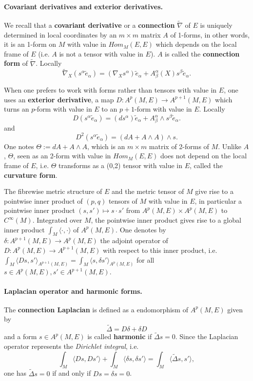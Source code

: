 \paragraph{Covariant derivatives and exterior derivatives.}
\label{sec:org5b3844c}
We recall that a \textbf{covariant derivative} or a \textbf{connection} \(\tilde\nabla\) of \(E\) is uniquely determined in 
local coordinates by an \(m\times m\) matrix \(A\) of 1-forms, in other
words, it is an 1-form on \(M\) with value in \(Hom_M(E,E)\) which depends on the local frame
of \(E\) (i.e. \(A\) is not a tensor with value in \(E\)). \(A\) is called the
\textbf{connection form} of \(\tilde \nabla\). Locally
\[
 \tilde\nabla_X (s^\alpha \tilde e_\alpha) = (\nabla_X s^\alpha) \tilde e_\alpha +
A^\alpha_\beta(X)s^\beta\tilde e_\alpha.
\]



When one prefers to work with forms rather than tensors with value in \(E\), one uses an
\textbf{exterior derivative}, a map \(D: A^p(M,E) \longrightarrow A^{p+1}(M,E)\) which turns an
\(p\)-form with value in \(E\) to an \(p+1\)-form with value in \(E\). Locally 
\[
 D (s^\alpha \tilde e_\alpha) = (d s^\alpha) \tilde e_\alpha +
A^\alpha_\beta\wedge s^\beta\tilde e_\alpha.
\]
and 
\[
 D^2(s^\alpha \tilde e_\alpha) = (dA + A\wedge A)\wedge s.
\]
One notes \(\Theta := dA + A\wedge A\), which is an \(m\times m\) matrix of 2-forms of
\(M\). Unlike \(A\), \(\Theta\), seen as an 2-form with value in \(Hom_M(E,E)\)
does not depend on the local frame of \(E\), i.e. \(\Theta\) transforms as a (0,2)
tensor with value in \(E\), called the \textbf{curvature form}.



The fibrewise metric structure of \(E\) and the metric tensor of \(M\) give rise to a pointwise inner product of
\((p,q)\) tensors of \(M\) with value in \(E\), in particular a pointwise inner
product \((s, s')\mapsto s\cdot s'\) from \(A^p(M,E)\times A^p(M,E)\) to \(C^\infty(M)\). Integrated over \(M\), the pointwise inner product gives rise
to a global inner product \(\int_M \langle  \cdot,\cdot \rangle\) of \(A^p(M,E)\). One denotes by
\(\delta: A^{p+1}(M,E)\longrightarrow A^p(M,E)\) the adjoint operator of
\(D: A^p(M,E) \longrightarrow A^{p+1}(M,E)\) with respect to this inner product, i.e.
\(\int_M\langle Ds, s' \rangle_{A^{p+1}(M,E)} = \int_M\langle s, \delta s' \rangle_{A^{p}(M,E)}\) for
all \(s\in A^{p}(M,E), s'\in A^{p+1}(M,E)\).



\paragraph{Laplacian operator and harmonic forms.}
\label{sec:orgbf49e8f}
The \textbf{connection Laplacian} is defined as a endomorphism of \(A^p(M,E)\) given by
\[
 \tilde \Delta = D\delta +\delta D
\]
and a form \(s\in A^p(M,E)\) is called \textbf{harmonic} if \(\tilde\Delta s=0\). Since the
Laplacian operator represents the \emph{Dirichlet integral}, i.e.
\[
 \int_M\langle Ds, Ds' \rangle + \int_M\langle \delta s, \delta s' \rangle = \int_M\langle \tilde\Delta s, s' \rangle,
\]
one has \(\tilde\Delta s = 0\) if and only if \(Ds = \delta s = 0\).



